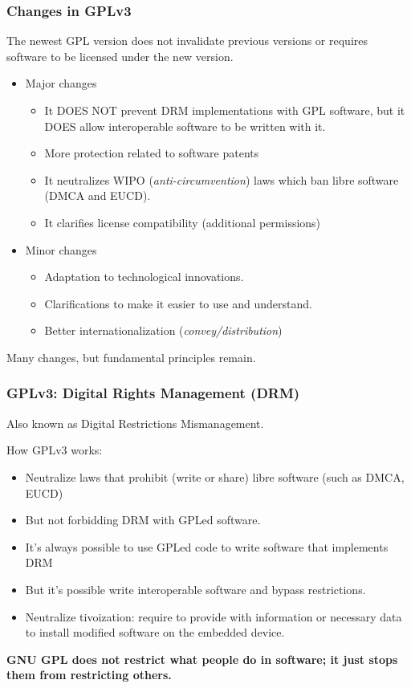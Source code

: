 \begin{frame}
\frametitle{Changes in GPLv3}
The newest GPL version does not invalidate previous versions or requires software to be licensed under the new version.
\begin{itemize}
\item Major changes
    \begin{itemize}
        \item It DOES NOT prevent DRM implementations with GPL software, but it DOES allow interoperable software to be written with it.
        \item {More protection related to software patents}
        \item It neutralizes WIPO (\textit{anti-circumvention}) laws which ban libre software (DMCA and EUCD).
        \item It clarifies license compatibility (additional permissions)
    \end{itemize}
\item Minor changes
    \begin{itemize}
        \item Adaptation to technological innovations.
        \item Clarifications to make it easier to use and understand.
        \item Better internationalization (\textit{convey/distribution})
    \end{itemize}
\end{itemize}

\pause

Many changes, but fundamental principles remain.

\end{frame}




\begin{frame}
\frametitle{GPLv3: Digital Rights Management (DRM)}

Also known as Digital Restrictions Mismanagement. 

How GPLv3 works:

\begin{itemize}
\item Neutralize laws that prohibit (write or share) libre software (such as DMCA, EUCD)
\item But not forbidding DRM with GPLed software.
\item It's always possible to use GPLed code to write software that implements DRM 
\item But it's possible write interoperable software and bypass restrictions. 
\item Neutralize tivoization: require to provide with information or necessary data to install modified software on the embedded device.
\end{itemize}

\textbf{GNU GPL does not restrict what people do in software; it just stops them from restricting others.}

\end{frame}

